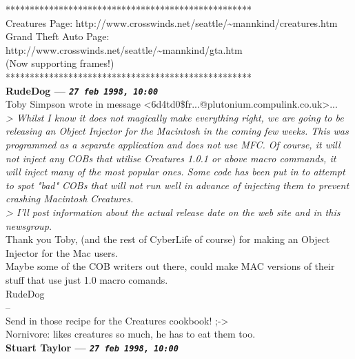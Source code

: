 \documentclass[11pt,twoside,a4paper]{article}
\begin{document}
\begin{multicols*}{2}
***************************************************~\\
Creatures Page: http://www.crosswinds.net/seattle/\textasciitilde mannkind/creatures.htm~\\
Grand Theft Auto Page: http://www.crosswinds.net/seattle/\textasciitilde mannkind/gta.htm~\\
(Now supporting frames!)~\\
***************************************************~\\

 
		
	
		
\textbf{RudeDog --- \emph{\texttt{27 feb 1998, 10:00}}}~\\

Toby Simpson wrote in message <6d4td0\$fr...@plutonium.compulink.co.uk>...~\\
\emph{> Whilst I know it does not magically make everything right, we are going to be releasing an Object Injector for the Macintosh in the coming few weeks. This was programmed as a separate application and does not use MFC. Of course, it will not inject any COBs that utilise Creatures 1.0.1 or above macro commands, it will inject many of the most popular ones. Some code has been put in to attempt to spot "bad" COBs that will not run well in advance of injecting them to prevent crashing Macintosh Creatures.}~\\

\emph{> I'll post information about the actual release date on the web site and in this newsgroup.}~\\

Thank you Toby, (and the rest of CyberLife of course) for making an Object Injector for the Mac users.~\\

Maybe some of the COB writers out there, could make MAC versions of their stuff that use just 1.0 macro comands.~\\

RudeDog~\\
-- ~\\
Send in those recipe for the Creatures cookbook!  ;->~\\

Nornivore: likes creatures so much, he has to eat them too.~\\

 
		
	
		
\textbf{Stuart Taylor --- \emph{\texttt{27 feb 1998, 10:00}}}~\\


\end{multicols*}
\end{document}
